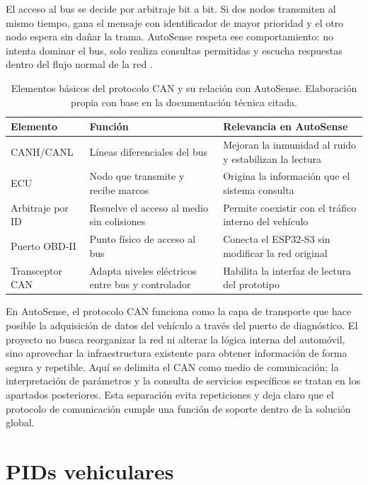 \documentclass[12pt,letterpaper]{report}
\begin{document}
El acceso al bus se decide por arbitraje bit a bit. Si dos nodos transmiten al mismo tiempo, gana el mensaje con identificador de mayor prioridad y el otro nodo espera sin dañar la trama. AutoSense respeta ese comportamiento: no intenta dominar el bus, solo realiza consultas permitidas y escucha respuestas dentro del flujo normal de la red \cite{vector2022_can_bitwise_arbitration}.

\begin{table}[!htbp]
    \centering
    \caption{Elementos básicos del protocolo CAN y su relación con AutoSense. Elaboración propia con base en la documentación técnica citada.}
    \label{tab:can-autosense-elementos}
    \small
    \begin{tabular}{p{}p{}p{}}
        \toprule
        Elemento & Función & Relevancia en AutoSense \\
        \midrule
        CANH/CANL & Líneas diferenciales del bus & Mejoran la inmunidad al ruido y estabilizan la lectura \\
        ECU & Nodo que transmite y recibe marcos & Origina la información que el sistema consulta \\
        Arbitraje por ID & Resuelve el acceso al medio sin colisiones & Permite coexistir con el tráfico interno del vehículo \\
        Puerto OBD-II & Punto físico de acceso al bus & Conecta el ESP32-S3 sin modificar la red original \\
        Transceptor CAN & Adapta niveles eléctricos entre bus y controlador & Habilita la interfaz de lectura del prototipo \\
        \bottomrule
    \end{tabular}
\end{table}

En AutoSense, el protocolo CAN funciona como la capa de transporte que hace posible la adquisición de datos del vehículo a través del puerto de diagnóstico. El proyecto no busca reorganizar la red ni alterar la lógica interna del automóvil, sino aprovechar la infraestructura existente para obtener información de forma segura y repetible. Aquí se delimita el CAN como medio de comunicación; la interpretación de parámetros y la consulta de servicios específicos se tratan en los apartados posteriores. Esta separación evita repeticiones y deja claro que el protocolo de comunicación cumple una función de soporte dentro de la solución global.

\section{PIDs vehiculares}
\end{document}
